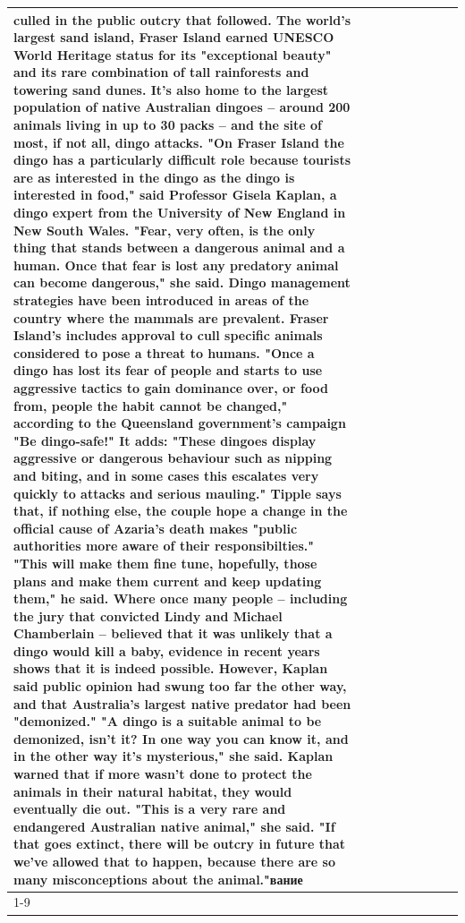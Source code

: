 \begin{table}[H]
\begin{tabular}{lllrlllll}
culled in the public outcry that followed. The world's largest sand island, Fraser Island earned UNESCO World Heritage status for its "exceptional beauty" and its rare combination of tall rainforests and towering sand dunes. It's also home to the largest population of native Australian dingoes -- around 200 animals living in up to 30 packs -- and the site of most, if not all, dingo attacks. "On Fraser Island the dingo has a particularly difficult role because tourists are as interested in the dingo as the dingo is interested in food," said Professor Gisela Kaplan, a dingo expert from the University of New England in New South Wales. "Fear, very often, is the only thing that stands between a dangerous animal and a human. Once that fear is lost any predatory animal can become dangerous," she said. Dingo management strategies have been introduced in areas of the country where the mammals are prevalent. Fraser Island's includes approval to cull specific animals considered to pose a threat to humans. "Once a dingo has lost its fear of people and starts to use aggressive tactics to gain dominance over, or food from, people the habit cannot be changed," according to the Queensland government's campaign "Be dingo-safe!" It adds: "These dingoes display aggressive or dangerous behaviour such as nipping and biting, and in some cases this escalates very quickly to attacks and serious mauling." Tipple says that, if nothing else, the couple hope a change in the official cause of Azaria's death makes "public authorities more aware of their responsibilties." "This will make them fine tune, hopefully, those plans and make them current and keep updating them," he said. Where once many people -- including the jury that convicted Lindy and Michael Chamberlain -- believed that it was unlikely that a dingo would kill a baby, evidence in recent years shows that it is indeed possible. However, Kaplan said public opinion had swung too far the other way, and that Australia's largest native predator had been "demonized." "A dingo is a suitable animal to be demonized, isn't it? In one way you can know it, and in the other way it's mysterious," she said. Kaplan warned that if more wasn't done to protect the animals in their natural habitat, they would eventually die out. "This is a very rare and endangered Australian native animal," she said. "If that goes extinct, there will be outcry in future that we've allowed that to happen, because there are so many misconceptions about the animal."вание \\
\cline{1-9}

\end{tabular}
\end{table}
